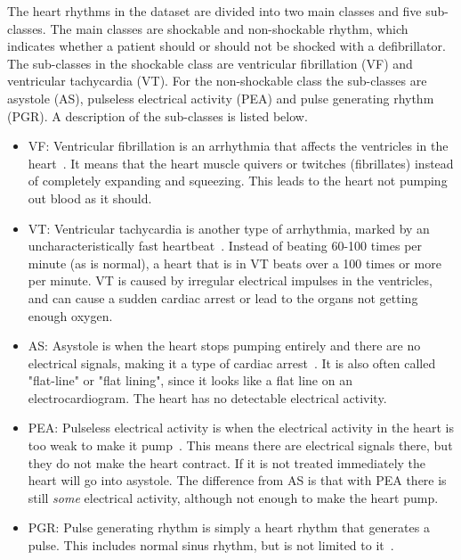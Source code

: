 The heart rhythms in the dataset are divided into two main classes and five sub-classes. The main classes are shockable and non-shockable rhythm, which indicates whether a patient should or should not be shocked with a defibrillator. The sub-classes in the shockable class are ventricular fibrillation (VF) and ventricular tachycardia (VT). For the non-shockable class the sub-classes are asystole (AS), pulseless electrical activity (PEA) and pulse generating rhythm (PGR). A description of the sub-classes is listed below.

\begin{itemize}
    \item VF: Ventricular fibrillation is an arrhythmia that affects the ventricles in the heart~\cite{vfib}. It means that the heart muscle quivers or twitches (fibrillates) instead of completely expanding and squeezing. This leads to the heart not pumping out blood as it should.
    \item VT: Ventricular tachycardia is another type of arrhythmia, marked by an uncharacteristically fast heartbeat~\cite{vtach}. Instead of beating 60-100 times per minute (as is normal), a heart that is in VT beats over a 100 times or more per minute. VT is caused by irregular electrical impulses in the ventricles, and can cause a sudden cardiac arrest or lead to the organs not getting enough oxygen.
    \item AS: Asystole is when the heart stops pumping entirely and there are no electrical signals, making it a type of cardiac arrest~\cite{asystole}. It is also often called "flat-line" or "flat lining", since it looks like a flat line on an electrocardiogram. The heart has no detectable electrical activity.
    \item PEA: Pulseless electrical activity is when the electrical activity in the heart is too weak to make it pump~\cite{PEA}. This means there are electrical signals there, but they do not make the heart contract. If it is not treated immediately the heart will go into asystole. The difference from AS is that with PEA there is still \textit{some} electrical activity, although not enough to make the heart pump.
    \item PGR: Pulse generating rhythm is simply a heart rhythm that generates a pulse. This includes normal sinus rhythm, but is not limited to it~\cite{PR}.
\end{itemize}